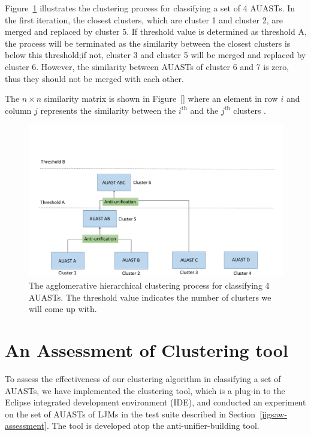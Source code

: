 Figure~\ref{fig:overview2} illustrates the clustering process for classifying a set of 4 AUASTs. In the first iteration, the closest clusters, which are cluster 1 and cluster 2, are merged and replaced by cluster 5. If threshold value is determined as threshold A, the process will be terminated as the similarity between the closest clusters is below this threshold;if not, cluster 3 and cluster 5 will be merged and  replaced by cluster 6. However, the similarity between AUASTs of cluster 6 and 7 is zero, thus they should not be merged with each other. 


The $n \times n$ similarity matrix is shown in Figure~\ref{} where an element in row $i$ and column $j$ represents the similarity between the $i^{\text{th}}$ and the $j^{\text{th}}$ clusters .

\begin{figure} [H]
  \centering\includegraphics [width = \textwidth]{Drawing4/overview2.pdf}
  \caption{The agglomerative hierarchical clustering process for classifying 4 AUASTs. The threshold value indicates the number of clusters we will come up with.}
  \label{fig:overview2}
\end{figure}




\section{An Assessment of Clustering tool}\label{clustering-assessment}
To assess the effectiveness of our clustering algorithm in classifying a set of AUASTs, we have implemented the clustering tool, which is a plug-in to the Eclipse integrated development environment (IDE), and conducted an experiment on the set of AUASTs of LJMs in the test suite described in Section~\ref{jigsaw-assessment}. The tool is developed atop the anti-unifier-building tool.

